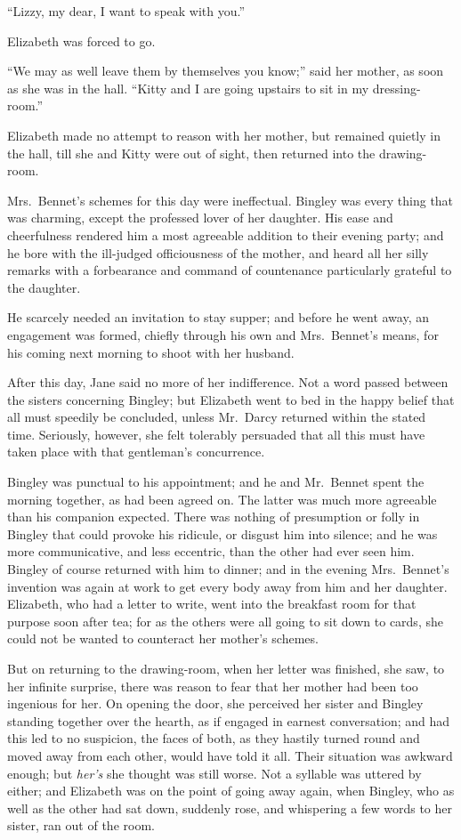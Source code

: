 \documentclass[12pt,english]{book}
\begin{document}
{}``Lizzy, my dear, I want to speak with you.''

Elizabeth was forced to go.

{}``We may as well leave them by themselves you know;'' said her
mother, as soon as she was in the hall. {}``Kitty and I are going
upstairs to sit in my dressing-room.''

Elizabeth made no attempt to reason with her mother, but remained
quietly in the hall, till she and Kitty were out of sight, then returned
into the drawing-room.

Mrs.\ Bennet's schemes for this day were ineffectual. Bingley was
every thing that was charming, except the professed lover of her daughter.
His ease and cheerfulness rendered him a most agreeable addition to
their evening party; and he bore with the ill-judged officiousness
of the mother, and heard all her silly remarks with a forbearance
and command of countenance particularly grateful to the daughter.

He scarcely needed an invitation to stay supper; and before he went
away, an engagement was formed, chiefly through his own and Mrs.\ Bennet's
means, for his coming next morning to shoot with her husband.

After this day, Jane said no more of her indifference. Not a word
passed between the sisters concerning Bingley; but Elizabeth went
to bed in the happy belief that all must speedily be concluded, unless
Mr.\ Darcy returned within the stated time. Seriously, however, she
felt tolerably persuaded that all this must have taken place with
that gentleman's concurrence.

Bingley was punctual to his appointment; and he and Mr.\ Bennet spent
the morning together, as had been agreed on. The latter was much more
agreeable than his companion expected. There was nothing of presumption
or folly in Bingley that could provoke his ridicule, or disgust him
into silence; and he was more communicative, and less eccentric, than
the other had ever seen him. Bingley of course returned with him to
dinner; and in the evening Mrs.\ Bennet's invention was again at
work to get every body away from him and her daughter. Elizabeth,
who had a letter to write, went into the breakfast room for that purpose
soon after tea; for as the others were all going to sit down to cards,
she could not be wanted to counteract her mother's schemes.

But on returning to the drawing-room, when her letter was finished,
she saw, to her infinite surprise, there was reason to fear that her
mother had been too ingenious for her. On opening the door, she perceived
her sister and Bingley standing together over the hearth, as if engaged
in earnest conversation; and had this led to no suspicion, the faces
of both, as they hastily turned round and moved away from each other,
would have told it all. Their situation was awkward enough; but \textit{her's}
she thought was still worse. Not a syllable was uttered by either;
and Elizabeth was on the point of going away again, when Bingley,
who as well as the other had sat down, suddenly rose, and whispering
a few words to her sister, ran out of the room.
\end{document}
